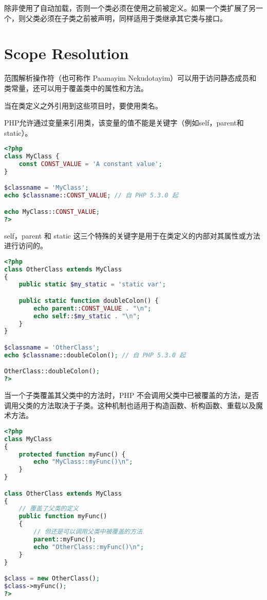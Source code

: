 除非使用了自动加载，否则一个类必须在使用之前被定义。如果一个类扩展了另一个，则父类必须在子类之前被声明，同样适用于类继承其它类与接口。


\chapter{Scope Resolution}

范围解析操作符（也可称作 Paamayim Nekudotayim）可以用于访问静态成员和类常量，还可以用于覆盖类中的属性和方法。

当在类定义之外引用到这些项目时，要使用类名。

PHP允许通过变量来引用类，该变量的值不能是关键字（例如self，parent和static）。

\begin{lstlisting}[language=PHP]
<?php
class MyClass {
    const CONST_VALUE = 'A constant value';
}

$classname = 'MyClass';
echo $classname::CONST_VALUE; // 自 PHP 5.3.0 起

echo MyClass::CONST_VALUE;
?>
\end{lstlisting}

self，parent 和 static 这三个特殊的关键字是用于在类定义的内部对其属性或方法进行访问的。


\begin{lstlisting}[language=PHP]
<?php
class OtherClass extends MyClass
{
    public static $my_static = 'static var';

    public static function doubleColon() {
        echo parent::CONST_VALUE . "\n";
        echo self::$my_static . "\n";
    }
}

$classname = 'OtherClass';
echo $classname::doubleColon(); // 自 PHP 5.3.0 起

OtherClass::doubleColon();
?>
\end{lstlisting}


当一个子类覆盖其父类中的方法时，PHP 不会调用父类中已被覆盖的方法，是否调用父类的方法取决于子类。这种机制也适用于构造函数、析构函数、重载以及魔术方法。

\begin{lstlisting}[language=PHP]
<?php
class MyClass
{
    protected function myFunc() {
        echo "MyClass::myFunc()\n";
    }
}

class OtherClass extends MyClass
{
    // 覆盖了父类的定义
    public function myFunc()
    {
        // 但还是可以调用父类中被覆盖的方法
        parent::myFunc();
        echo "OtherClass::myFunc()\n";
    }
}

$class = new OtherClass();
$class->myFunc();
?>
\end{lstlisting}


